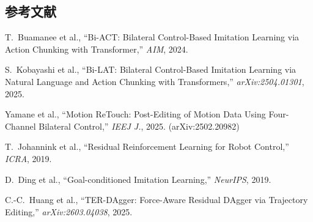 \documentclass[a4paper,10pt]{jlreq}
\begin{document}
\subsection*{参考文献}

{\small
\begin{enumerate}[label={[\arabic*]}, leftmargin=2.5em]
  \item T.~Buamanee et al., ``Bi-ACT: Bilateral Control-Based Imitation Learning via Action Chunking with Transformer,'' \textit{AIM}, 2024.
  \item S.~Kobayashi et al., ``Bi-LAT: Bilateral Control-Based Imitation Learning via Natural Language and Action Chunking with Transformers,'' \textit{arXiv:2504.01301}, 2025.
  \item Yamane et al., ``Motion ReTouch: Post-Editing of Motion Data Using Four-Channel Bilateral Control,'' \textit{IEEJ J.}, 2025. (arXiv:2502.20982)
  \item T.~Johannink et al., ``Residual Reinforcement Learning for Robot Control,'' \textit{ICRA}, 2019.
  \item D.~Ding et al., ``Goal-conditioned Imitation Learning,'' \textit{NeurIPS}, 2019.
  \item C.-C.~Huang et al., ``TER-DAgger: Force-Aware Residual DAgger via Trajectory Editing,'' \textit{arXiv:2603.04038}, 2025.
\end{enumerate}
}
\end{document}
